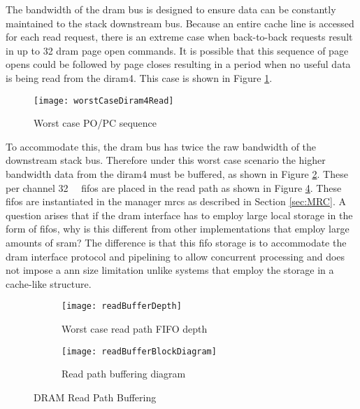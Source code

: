The bandwidth of the \ac{dram} bus is designed to ensure data can be constantly maintained to the stack downstream bus.
Because an entire cache line is accessed for each read request, there is an extreme case when back-to-back requests result in up to 32 \ac{dram} page open commands.
It is possible that this sequence of page opens could be followed by page closes resulting in a period when no useful data is being read from the \ac{diram4}.
This case is shown in Figure \ref{fig:Worst case PO/PC sequence}.
\begin{figure}[!t]
\centering
\captionsetup{justification=centering}
\captionsetup{width=.9\linewidth}
\centerline{
\mbox{\texttt{[image: worstCaseDiram4Read]}}
}
\caption{Worst case PO/PC sequence}
\label{fig:Worst case PO/PC sequence}
\end{figure}
To accommodate this, the \ac{dram} bus has twice the raw bandwidth of the downstream stack bus. 
Therefore under this worst case scenario the higher bandwidth data from the \ac{diram4} must be buffered, as shown in Figure \ref{fig:Worst case read path FIFO depth}.
These per channel \SI[per-mode=symbol]{32}{\kilo\bit} \acp{fifo} are placed in the read path as shown in Figure \ref{fig:DRAM Read Path Buffering}.
These \acp{fifo} are instantiated in the manager \acp{mrc} as described in Section \ref{sec:MRC}.
A question arises that if the \ac{dram} interface has to employ large local storage in the form of \acp{fifo}, why is this different from other implementations that employ large amounts of \ac{sram}?
The difference is that this \ac{fifo} storage is to accommodate the \ac{dram} interface protocol and  pipelining to allow concurrent processing and does not impose a \ac{ann} size limitation unlike systems that employ the storage in a cache-like structure.


\begin{figure}
\centering
\begin{subfigure}{.9\textwidth}
  \centering
  \texttt{[image: readBufferDepth]}
  \captionsetup{justification=centering, skip=0pt}
  \caption{Worst case read path FIFO depth}
  \label{fig:Worst case read path FIFO depth}
\end{subfigure}%

\bigskip

\vspace{-10pt}
\begin{subfigure}{.9\textwidth}
  \centering
  \texttt{[image: readBufferBlockDiagram]}
  \captionsetup{justification=centering, skip=6pt}
  \caption{Read path buffering diagram}
  \label{fig:Read path buffering diagram}
\end{subfigure}
\captionsetup{justification=centering, skip=16pt}
\caption{DRAM Read Path Buffering}
\label{fig:DRAM Read Path Buffering}
\end{figure}


